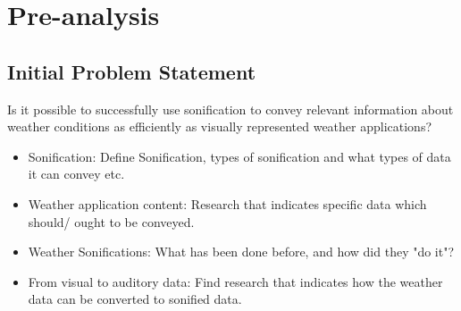 \section{Pre-analysis} \label{sec:preanalysus}

\subsection{Initial Problem Statement} \label{sec:ips}
Is it possible to successfully use sonification to convey relevant information about weather conditions as efficiently as visually represented weather applications?

\begin{itemize}
\item Sonification: 
Define Sonification, types of sonification and what types of data it can convey etc.
\item Weather application content:
Research that indicates specific data which should/ ought to be conveyed.
\item Weather Sonifications:
What has been done before, and how did they "do it"?
\item From visual to auditory data:
Find research that indicates how the weather data can be converted to sonified data.

\end{itemize}